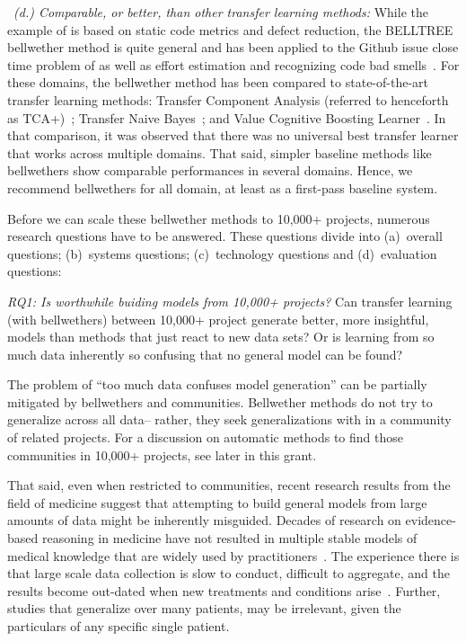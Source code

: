 ~{\em (d.) Comparable, or better, than   other 
transfer learning methods:} 
While
the example of  is based on static code
metrics and defect reduction, the BELLTREE bellwether method is
quite general and has  been
applied to the Github issue close time 
problem of  as well
as effort estimation and recognizing code bad smells~\cite{krishna19a}.
For these
domains, the bellwether method has been  compared
to state-of-the-art transfer learning methods:
Transfer Component Analysis (referred to henceforth as TCA+)~\cite{XXX};
Transfer Naive Bayes~\cite{XXX}; and
 Value Cognitive Boosting Learner~\cite{XXX}.
 In that comparison,
 it was observed that
there was no universal best transfer learner that works across multiple domains. That said, simpler baseline methods like bellwethers show comparable performances in several domains. Hence, we recommend bellwethers for all domain, at
least as a first-pass baseline system.


 Before we can scale these bellwether methods to 10,000+ projects, numerous research questions have
to be answered. These questions divide into (a)~overall questions; (b)~systems questions; (c)~technology questions and (d)~evaluation questions: 




{\em RQ1: Is   worthwhile buiding models from 10,000+ projects?}  Can transfer learning (with bellwethers) between 10,000+ project generate better, more insightful, models than
 methods that  just react to  new data sets? Or is learning from so much data inherently so confusing that no general model can be found?
 
The problem of ``too much data confuses model generation'' can be partially 
mitigated by bellwethers and communities.
Bellwether methods do not try to generalize across all data-- rather, they seek generalizations with in a community of related projects. For a discussion on automatic methods to find those communities in 10,000+ projects, see later in this grant.

That said, even when restricted to communities,
recent research results from the field of medicine suggest
that  attempting to build general models from large amounts of
data   might be inherently misguided. Decades of research on evidence-based reasoning in medicine have not resulted in multiple
stable models of medical knowledge that are widely used by practitioners~\cite{gallego2013role,gallego2015bringing}.  The experience there
is that large scale data collection is slow to conduct,
difficult to aggregate, and the   results become out-dated  when  new treatments and conditions arise~\cite{gallego2013role}. 
Further, studies that   generalize over many patients,
may be irrelevant, given   the particulars of any specific single patient. 

